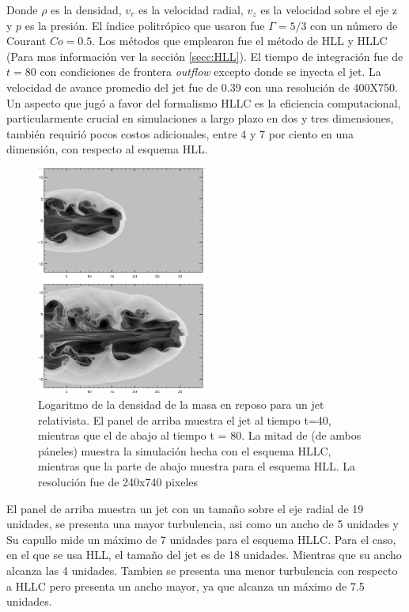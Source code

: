\documentclass[12pt,a4paper]{book}
\begin{document}
Donde $\rho$ es la densidad, $v_r$ es la velocidad radial, $v_z$ es la velocidad sobre el eje z y $p$ es la presión. El índice politrópico que usaron fue $\Gamma = 5/3$ con un número de Courant $Co = 0.5$.
Los métodos que emplearon fue el método de HLL y HLLC (Para mas información ver la sección \ref{secc:HLL}). El tiempo de integración fue de $t = 80$ con condiciones de frontera \emph{outflow} excepto donde se 
inyecta el jet. La velocidad de avance promedio  del jet fue de 0.39 con una resolución de 400X750. Un aspecto que jugó a favor del formalismo HLLC es la eficiencia computacional, particularmente crucial en 
simulaciones a largo plazo en dos y tres dimensiones, también requirió pocos costos adicionales, entre 4 y 7 por ciento en una dimensión, con respecto al esquema HLL. 
\begin{figure}
  \begin{center}
    \includegraphics[width=0.5\textwidth]{Figuras/Introduccion/jet_mignone.png}
  \end{center}
  \caption{Logaritmo de la densidad de la masa en reposo para un jet relativista. El panel de arriba muestra el jet al tiempo t=40, mientras que el de abajo al tiempo t = 80.
  La mitad de  (de ambos páneles) muestra la simulación hecha con el esquema HLLC, mientras que la parte de abajo muestra para el esquema HLL.
  La resolución fue de 240x740 pixeles}
  \label{fig:jet_mignone}
\end{figure}
{\color{blue}El panel de arriba muestra un jet con un tamaño sobre el eje radial de 19 unidades, se presenta una mayor turbulencia, asi como un ancho de 5 unidades y Su capullo
mide un máximo de 7 unidades para el esquema HLLC.
Para el caso, en el que se usa HLL, el tamaño del jet es de 18 unidades. Mientras que su ancho alcanza las 4 unidades. Tambien se presenta una menor turbulencia con respecto a HLLC pero presenta un 
ancho mayor, ya que alcanza un máximo de 7.5 unidades.}
\end{document}
